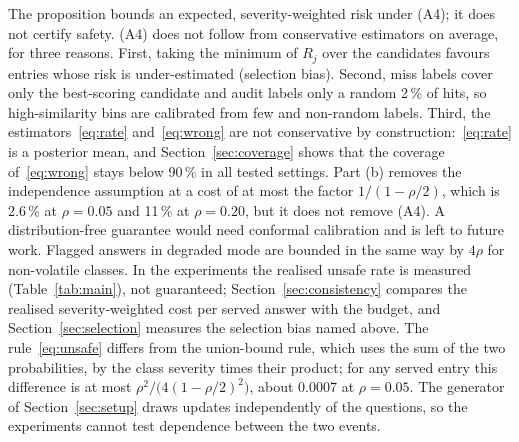 \documentclass[journal]{IEEEtran}
\newcommand{\pct}{\,\%}
\begin{document}
The proposition bounds an expected, severity-weighted risk under (A4); it does not certify safety. (A4) does not follow from conservative estimators on average, for three reasons. First, taking the minimum of $R_j$ over the candidates favours entries whose risk is under-estimated (selection bias). Second, miss labels cover only the best-scoring candidate and audit labels only a random 2\pct{} of hits, so high-similarity bins are calibrated from few and non-random labels. Third, the estimators~\eqref{eq:rate} and~\eqref{eq:wrong} are not conservative by construction:~\eqref{eq:rate} is a posterior mean, and Section~\ref{sec:coverage} shows that the coverage of~\eqref{eq:wrong} stays below 90\pct{} in all tested settings. Part (b) removes the independence assumption at a cost of at most the factor $1/(1-\rho/2)$, which is 2.6\pct{} at $\rho=0.05$ and 11\pct{} at $\rho=0.20$, but it does not remove (A4). A distribution-free guarantee would need conformal calibration \cite{angelopoulos2021} and is left to future work. Flagged answers in degraded mode are bounded in the same way by $4\rho$ for non-volatile classes. In the experiments the realised unsafe rate is measured (Table~\ref{tab:main}), not guaranteed; Section~\ref{sec:consistency} compares the realised severity-weighted cost per served answer with the budget, and Section~\ref{sec:selection} measures the selection bias named above. The rule~\eqref{eq:unsafe} differs from the union-bound rule, which uses the sum of the two probabilities, by the class severity times their product; for any served entry this difference is at most $\rho^2/\big(4(1-\rho/2)^2\big)$, about 0.0007 at $\rho=0.05$. The generator of Section~\ref{sec:setup} draws updates independently of the questions, so the experiments cannot test dependence between the two events.
\end{document}
